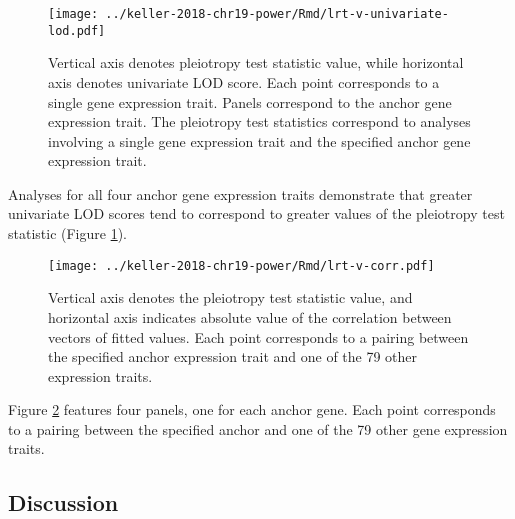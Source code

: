 \documentclass{book}
\begin{document}
\begin{figure}
    \centering
    \texttt{[image: ../keller-2018-chr19-power/Rmd/lrt-v-univariate-lod.pdf]}
    \caption[Pleiotropy LRT vs. univariate LOD score plots reveal that greater univariate LOD scores (and greater interlocus distance) tend to correspond to greater pleiotropy LRT values.]{Vertical axis denotes pleiotropy test statistic value, while horizontal axis denotes univariate LOD score. Each point corresponds to a single gene expression trait. Panels correspond to the anchor gene expression trait. The pleiotropy test statistics correspond to analyses involving a single gene expression trait and the specified anchor gene expression trait.}
    \label{fig:lod}
\end{figure}

Analyses for all four anchor gene expression traits demonstrate that greater univariate LOD scores tend to correspond to greater values of the pleiotropy test statistic (Figure \ref{fig:lod}).









\begin{figure}
    \centering
    \texttt{[image: ../keller-2018-chr19-power/Rmd/lrt-v-corr.pdf]}
    \caption[Pleiotropy LRT vs. fitted values correlations plots reveal little evidence for a relationship.]{Vertical axis denotes the pleiotropy test statistic value, and horizontal axis indicates absolute value of the correlation between vectors of fitted values. Each point corresponds to a pairing between the specified anchor expression trait and one of the 79 other expression traits.}
    \label{fig:cor}
\end{figure}

Figure \ref{fig:cor} features four panels, one for each anchor gene. Each point corresponds to a pairing between the specified anchor and one of the 79 other gene expression traits.



\subsection{Discussion}
\end{document}
